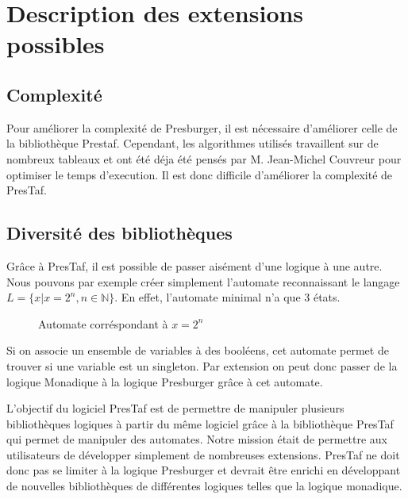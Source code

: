 \section{Description des extensions possibles}

\subsection{Complexité}

Pour améliorer la complexité de Presburger, il est nécessaire d'améliorer celle de la bibliothèque Prestaf. Cependant, les algorithmes utilisés travaillent sur de nombreux tableaux et ont été déja été pensés par M. Jean-Michel Couvreur pour optimiser le temps d'execution. Il est donc difficile d'améliorer la complexité de PresTaf.

\subsection{Diversité des bibliothèques}

Grâce à PresTaf, il est possible de passer aisément d'une logique à une autre. Nous pouvons par exemple créer simplement l'automate reconnaissant le langage $L = \{x | x = 2^n, n \in \mathbb{N} \}$. En effet, l'automate minimal n'a que 3 états.

\begin{figure}[h]

\centering

\caption{Automate corréspondant à $x = 2^n$}
\end{figure}

Si on associe un ensemble de variables à des booléens, cet automate permet de trouver si une variable est un singleton. Par extension on peut donc passer de la logique Monadique à la logique Presburger grâce à cet automate.\\\par

L'objectif du logiciel PresTaf est de permettre de manipuler plusieurs bibliothèques logiques à partir du même logiciel grâce à la bibliothèque PresTaf qui permet de manipuler des automates. Notre mission était de permettre aux utilisateurs de développer simplement de nombreuses extensions. PresTaf ne doit donc pas se limiter à la logique Presburger et devrait être enrichi en développant de nouvelles bibliothèques de différentes logiques telles que la logique monadique. 
